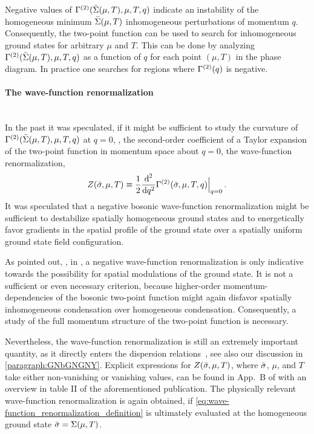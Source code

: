 Negative values of $\Gamma^{(2)} ( \bar{\Sigma} ( \mu, T ), \mu, T, q)$ indicate an instability of the homogeneous minimum $\bar{\Sigma} ( \mu, T )$ \wrt{}  inhomogeneous perturbations of momentum $q$.
Consequently, the two-point function can be used to search for inhomogeneous ground states for arbitrary $\mu$ and $T$.
This can be done by analyzing $\Gamma^{(2)} ( \bar{\Sigma} ( \mu, T ), \mu, T, q)$ as a function of $q$ for each point $( \mu, T )$ in the phase diagram.
In practice one searches for regions where $\Gamma^{(2)}(q)$ is negative.

\paragraph{The wave-function renormalization}\label{paragraph:GNZphi}\mbox{}\\%
In the past it was speculated, if it might be sufficient to study the curvature of $\Gamma^{(2)} ( \bar{\Sigma} ( \mu, T ), \mu, T, q)$ at ${q = 0}$, \ie{}, the second-order coefficient of a Taylor expansion of the two-point function in momentum space about ${q=0}$, \viz{} the wave-function renormalization,
\begin{equation}
	\zwave{\shom}{\mu}{T} \equiv \frac{1}{2} \frac{\dif^{\, 2}}{\dif q^2} \gtwovardef \Big|_{q = 0} \, .	\label{eq:wave-function_renormalization_definition}
\end{equation}
It was speculated that a negative bosonic wave-function renormalization might be sufficient to destabilize spatially homogeneous ground states and to energetically favor gradients in the spatial profile of the ground state over a spatially uniform ground state field configuration.
	
As pointed out, \eg{}, in , a negative wave-function renormalization is only indicative towards the possibility for spatial modulations of the ground state.
It is not a sufficient or even necessary criterion, because higher-order momentum-dependencies of the bosonic two-point function might again disfavor spatially inhomogeneous condensation over homogeneous condensation.
Consequently, a study of the full momentum structure of the two-point function is necessary.
	
Nevertheless, the wave-function renormalization is still an extremely important quantity, as it directly enters the dispersion relations~\cite{Pisarski:2021qof,Rennecke:2021ovl}, see also our discussion in \cref{paragraph:GNbGNGNY}.
Explicit expressions for $Z ( \bar{\sigma}, \mu, T )$, where $\bar{\sigma}$, $\mu$, and $T$ take either non-vanishing or vanishing values, can be found in App.~B of  with an overview in table II of the aforementioned publication.
The physically relevant wave-function renormalization is again obtained, if \cref{eq:wave-function_renormalization_definition} is ultimately evaluated at the homogeneous ground state ${\bar{\sigma} = \Sigma ( \mu, T )}$.

